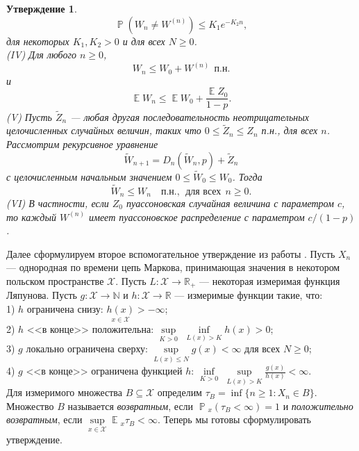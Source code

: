 \documentclass[10pt, reqno]{amsart}
\newtheorem{numbered_theorem}{Утверждение}
\DeclareMathOperator*{\E}{\mathbb{E}}
\DeclareMathOperator*{\Pb}{\mathbb{P}}
\begin{document}
\begin{numbered_theorem}
\begin{equation}
    \Pb(W_{n} \neq W^{(n)}) \leq K_{1}e^{−K_{2}n},
\end{equation}
для некоторых $K_{1}, K_{2} > 0$ и для всех $N \geq 0$.
\\
(IV) Для любого $n \geq 0$,
\begin{equation}
    W_{n} \leq W_{0} + W^{(n)} \:\: \text{п.н.}
\end{equation}
и
\begin{equation}
    \E{}W_{n} \leq \E{}W_{0} + \frac{\E{}Z_{0}}{1-p}.
\end{equation}
(V) Пусть $\widetilde{Z}_{n}$ --- любая другая последовательность неотрицательных целочисленных случайных величин, таких что $0 \leq \widetilde{Z}_{n} \leq Z_{n}$ п.н., для всех $n$. Рассмотрим рекурсивное уравнение
\begin{equation}
    \widetilde{W}_{n+1} = D_{n}(\widetilde{W}_{n}, p) + \widetilde{Z}_{n}
\end{equation}
с целочисленным начальным значением $0 \leq \widetilde{W}_{0} \leq W_{0}$. Тогда
\begin{equation}
    \widetilde{W}_{n} \leq W_{n} \quad \text{п.н.}, \:\: \text{для всех} \:\: n \geq 0.
\end{equation}
(VI) В частности, если $Z_{0}$ пуассоновская случайная величина с параметром $c$, то каждый $W^{(n)}$ имеет пуассоновское распределение с параметром $c/(1-p)$.
\end{numbered_theorem}
Далее сформулируем второе вспомогательное утверждение из работы . Пусть $X_{n}$ --- однородная по времени цепь Маркова, принимающая значения в некотором польском пространстве $\mathcal{X}$. Пусть $L:\mathcal{X} \to \mathbb{R}_{+}$ --- некоторая измеримая функция Ляпунова. Пусть $g:\mathcal{X} \to \mathbb{N}$ и $h:\mathcal{X} \to \mathbb{R}$ --- измеримые функции такие, что:\\
1) $h$ ограничена снизу: $\underset{x \in \mathcal{X}}{h(x)} > -\infty$;\\
2) $h$ <<в конце>> положительна: $\underset{K > 0}{\sup}$ $\underset{L(x) > K}{\inf}h(x) > 0$;\\
3) $g$ локально ограничена сверху: $\underset{L(x) \leq N}{\sup}g(x) < \infty$ для всех $N \geq 0$;\\
4) $g$ <<в конце>> ограничена функцией $h$: $\underset{K > 0}{\inf}$ $\underset{L(x) > K}{\sup}\frac{g(x)}{h(x)} < \infty$.\\
Для измеримого множества $B \subseteq \mathcal{X}$ определим $\tau_{B} = \inf\{n \geq 1: X_{n} \in B\}$. Множество $B$ называется \textit{возвратным}, если $\Pb{}_{x}(\tau_{B} < \infty) = 1$ и \textit{положительно возвратным}, если $\underset{x \in \mathcal{X}}{\sup}\E{}_{x}\tau_{B} < \infty$. Теперь мы готовы сформулировать утверждение.
\end{document}
